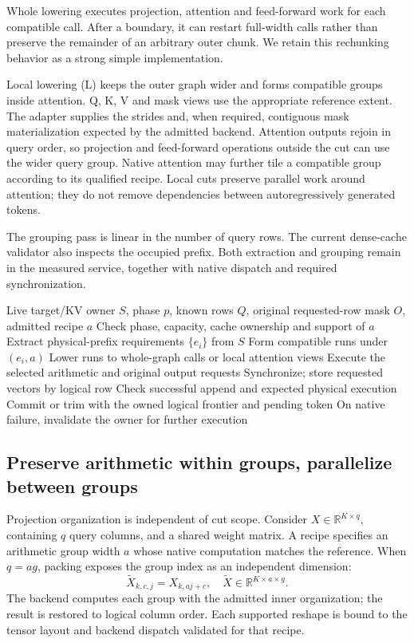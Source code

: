Whole lowering executes projection, attention and feed-forward work for each compatible call. After a boundary, it can restart full-width calls rather than preserve the remainder of an arbitrary outer chunk. We retain this rechunking behavior as a strong simple implementation.

Local lowering (L) keeps the outer graph wider and forms compatible groups inside attention. Q, K, V and mask views use the appropriate reference extent. The adapter supplies the strides and, when required, contiguous mask materialization expected by the admitted backend. Attention outputs rejoin in query order, so projection and feed-forward operations outside the cut can use the wider query group. Native attention may further tile a compatible group according to its qualified recipe. Local cuts preserve parallel work around attention; they do not remove dependencies between autoregressively generated tokens.

The grouping pass is linear in the number of query rows. The current dense-cache validator also inspects the occupied prefix. Both extraction and grouping remain in the measured service, together with native dispatch and required synchronization.

\begin{algorithm}[t]
\caption{Execute a reference-derived phase}
\label{alg:plan}
\begin{algorithmic}[1]
\Require Live target/KV owner $S$, phase $p$, known rows $Q$, original requested-row mask $O$, admitted recipe $a$
\State Check phase, capacity, cache ownership and support of $a$
\State Extract physical-prefix requirements $\{e_i\}$ from $S$
\State Form compatible runs under $(e_i,a)$
\State Lower runs to whole-graph calls or local attention views
 \State Execute the selected arithmetic and original output requests
 \State Synchronize; store requested vectors by logical row
 \State Check successful append and expected physical execution
\EndFor
\State Commit or trim with the owned logical frontier and pending token
\State On native failure, invalidate the owner for further execution
\end{algorithmic}
\end{algorithm}

\subsection{Preserve arithmetic within groups, parallelize between groups}
\label{sec:recipes}
Projection organization is independent of cut scope. Consider $X\in\mathbb{R}^{K\times q}$, containing $q$ query columns, and a shared weight matrix. A recipe specifies an arithmetic group width $a$ whose native computation matches the reference. When $q=ag$, packing exposes the group index as an independent dimension:
\begin{equation}
 \widetilde X_{k,c,j}=X_{k,aj+c},\quad
 \widetilde X\in\mathbb{R}^{K\times a\times g}.
 \label{eq:packing}
\end{equation}
The backend computes each group with the admitted inner organization; the result is restored to logical column order. Each supported reshape is bound to the tensor layout and backend dispatch validated for that recipe.

